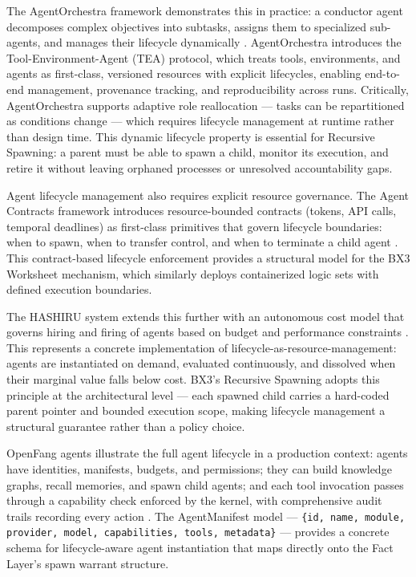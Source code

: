 The AgentOrchestra framework demonstrates this in practice: a conductor agent decomposes complex objectives into subtasks, assigns them to specialized sub-agents, and manages their lifecycle dynamically \cite{agentorchestra2025}. AgentOrchestra introduces the Tool-Environment-Agent (TEA) protocol, which treats tools, environments, and agents as first-class, versioned resources with explicit lifecycles, enabling end-to-end management, provenance tracking, and reproducibility across runs. Critically, AgentOrchestra supports adaptive role reallocation — tasks can be repartitioned as conditions change — which requires lifecycle management at runtime rather than design time. This dynamic lifecycle property is essential for Recursive Spawning: a parent must be able to spawn a child, monitor its execution, and retire it without leaving orphaned processes or unresolved accountability gaps.

Agent lifecycle management also requires explicit resource governance. The Agent Contracts framework introduces resource-bounded contracts (tokens, API calls, temporal deadlines) as first-class primitives that govern lifecycle boundaries: when to spawn, when to transfer control, and when to terminate a child agent \cite{agentcontracts2025}. This contract-based lifecycle enforcement provides a structural model for the BX3 Worksheet mechanism, which similarly deploys containerized logic sets with defined execution boundaries.

The HASHIRU system extends this further with an autonomous cost model that governs hiring and firing of agents based on budget and performance constraints \cite{hashiru2025}. This represents a concrete implementation of lifecycle-as-resource-management: agents are instantiated on demand, evaluated continuously, and dissolved when their marginal value falls below cost. BX3's Recursive Spawning adopts this principle at the architectural level — each spawned child carries a hard-coded parent pointer and bounded execution scope, making lifecycle management a structural guarantee rather than a policy choice.

OpenFang agents illustrate the full agent lifecycle in a production context: agents have identities, manifests, budgets, and permissions; they can build knowledge graphs, recall memories, and spawn child agents; and each tool invocation passes through a capability check enforced by the kernel, with comprehensive audit trails recording every action \cite{openfang2025}. The AgentManifest model — \texttt{\{id, name, module, provider, model, capabilities, tools, metadata\}} — provides a concrete schema for lifecycle-aware agent instantiation that maps directly onto the Fact Layer's spawn warrant structure.

